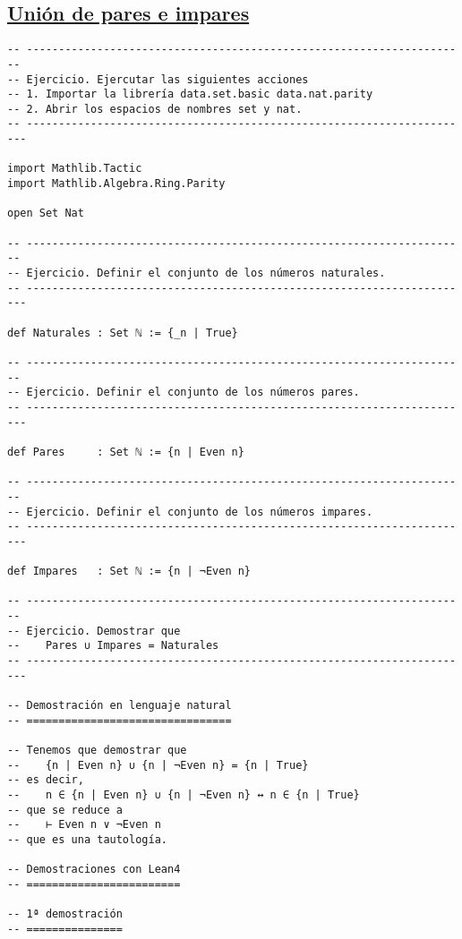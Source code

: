 \subsection{\href{./src/Conjuntos/Union\_de\_pares\_e\_impares.lean}{Unión de pares e impares}}
\label{sec:orgf63436b}
\begin{verbatim}
-- ---------------------------------------------------------------------
-- Ejercicio. Ejercutar las siguientes acciones
-- 1. Importar la librería data.set.basic data.nat.parity
-- 2. Abrir los espacios de nombres set y nat.
-- ----------------------------------------------------------------------

import Mathlib.Tactic
import Mathlib.Algebra.Ring.Parity

open Set Nat

-- ---------------------------------------------------------------------
-- Ejercicio. Definir el conjunto de los números naturales.
-- ----------------------------------------------------------------------

def Naturales : Set ℕ := {_n | True}

-- ---------------------------------------------------------------------
-- Ejercicio. Definir el conjunto de los números pares.
-- ----------------------------------------------------------------------

def Pares     : Set ℕ := {n | Even n}

-- ---------------------------------------------------------------------
-- Ejercicio. Definir el conjunto de los números impares.
-- ----------------------------------------------------------------------

def Impares   : Set ℕ := {n | ¬Even n}

-- ---------------------------------------------------------------------
-- Ejercicio. Demostrar que
--    Pares ∪ Impares = Naturales
-- ----------------------------------------------------------------------

-- Demostración en lenguaje natural
-- ================================

-- Tenemos que demostrar que
--    {n | Even n} ∪ {n | ¬Even n} = {n | True}
-- es decir,
--    n ∈ {n | Even n} ∪ {n | ¬Even n} ↔ n ∈ {n | True}
-- que se reduce a
--    ⊢ Even n ∨ ¬Even n
-- que es una tautología.

-- Demostraciones con Lean4
-- ========================

-- 1ª demostración
-- ===============


\end{verbatim}
